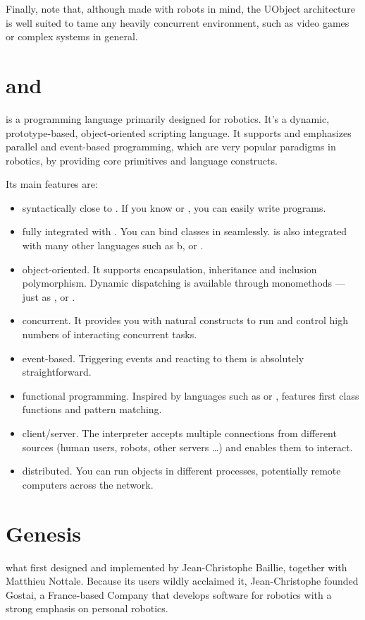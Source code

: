 Finally, note that, although made with robots in mind, the UObject
architecture is well suited to tame any heavily concurrent
environment, such as video games or complex systems in general.

\section{\urbi and \us}

\us is a programming language primarily designed for robotics. It's a
dynamic, prototype-based, object-oriented scripting language. It
supports and emphasizes parallel and event-based programming, which
are very popular paradigms in robotics, by providing core primitives
and language constructs.

Its main features are:
\begin{itemize}
\item syntactically close to \Cxx. If you know \C or \Cxx, you can
  easily write \us programs.
\item fully integrated with \Cxx. You can bind \Cxx classes in \us
  seamlessly. \us is also integrated with many other languages such as
  b\Java, \MatLab or \Python.
\item object-oriented. It supports encapsulation, inheritance and
  inclusion polymorphism. Dynamic dispatching is available through
  monomethods --- just as \Cxx, \Cs or \Java.
\item concurrent. It provides you with natural constructs to run and
  control high numbers of interacting concurrent tasks.
\item event-based. Triggering events and reacting to them is
  absolutely straightforward.
\item functional programming.  Inspired by languages such as \Lisp or
  \Caml, \us features first class functions and pattern matching.
\item client/server.  The interpreter accepts multiple connections
  from different sources (human users, robots, other servers \ldots)
  and enables them to interact.
\item distributed.  You can run objects in different processes,
  potentially remote computers across the network.
\end{itemize}

\section{Genesis}

\urbi what first designed and implemented by Jean-Christophe Baillie,
together with Matthieu Nottale.  Because its users wildly acclaimed it,
Jean-Christophe founded Gostai, a France-based Company that develops
software for robotics with a strong emphasis on personal robotics.

